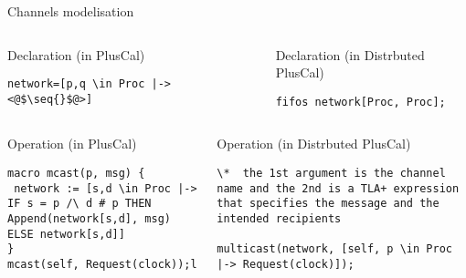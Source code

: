 \documentclass{beamer}
\newcommand{\seq}[1]{\langle #1 \rangle}
\begin{document}
\begin{frame}[fragile]{Channels modelisation}

\begin{columns}
\begin{column}{0.52\textwidth}
\begin{exampleblock}{Declaration (in PlusCal)}
        \begin{lstlisting}[language=pluscal, frame = none, numbers = none]
network=[p,q \in Proc |-> <@$\seq{}$@>] 
\end{lstlisting}
\end{exampleblock}
\end{column}
\pause

\begin{column}{0.57\textwidth}
\begin{exampleblock}{Declaration (in Distrbuted PlusCal)}
 \begin{lstlisting}[language=pluscal, frame = none, numbers = none]
fifos network[Proc, Proc];\end{lstlisting}
\end{exampleblock}
\end{column}
\pause
\end{columns}

\begin{columns}
\begin{column}{0.5\textwidth}
\begin{exampleblock}{Operation (in PlusCal)}
        \begin{lstlisting}[language=pluscal, frame = none, numbers = none]
macro mcast(p, msg) {
 network := [s,d \in Proc |-> IF s = p /\ d # p THEN Append(network[s,d], msg) ELSE network[s,d]]
}
mcast(self, Request(clock));l\end{lstlisting}
\end{exampleblock}
\end{column}
\pause

\begin{column}{0.57\textwidth}
\begin{exampleblock}{Operation (in Distrbuted PlusCal)}
 \begin{lstlisting}[language=pluscal, frame = none, numbers = none]
 \*  the 1st argument is the channel name and the 2nd is a TLA+ expression that specifies the message and the intended recipients
 
multicast(network, [self, p \in Proc |-> Request(clock)]);

\end{lstlisting}
\newline

\end{exampleblock}
\end{column}
\end{columns}
\end{frame}
\end{document}
